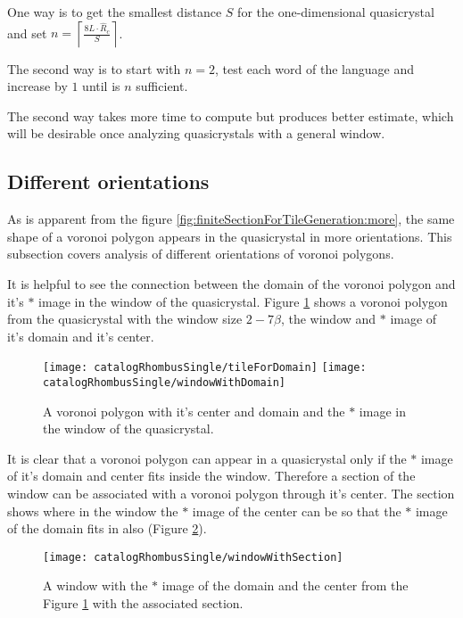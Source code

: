 \documentclass[text.tex]{subfiles}
\begin{document}
One way is to get the smallest distance $S$ for the one-dimensional quasicrystal and set $n = \left\lceil\frac{8L\cdot\hat{R}_c}{S}\right\rceil$. 

The second way is to start with $n=2$, test each word of the language and increase by $1$ until is $n$ sufficient. 

The second way takes more time to compute but produces better estimate, which will be desirable once analyzing quasicrystals with a general window.

\subsection{Different orientations}
As is apparent from the figure \ref{fig:finiteSectionForTileGeneration:more}, the same shape of a voronoi polygon appears in the quasicrystal in more orientations. This subsection covers analysis of different orientations of voronoi polygons. 

It is helpful to see the connection between the domain of the voronoi polygon and it's $\ast$ image in the window of the quasicrystal. Figure \ref{fig:windowWithDomain} shows a voronoi polygon from the quasicrystal with the window size $2-7\beta$, the window and $\ast$ image of it's domain and it's center. 

\begin{figure}[h]
\centering
\texttt{[image: catalogRhombusSingle/tileForDomain]}
\texttt{[image: catalogRhombusSingle/windowWithDomain]}
\caption{A voronoi polygon with it's center and domain and the $\ast$ image in the window of the quasicrystal.}
\label{fig:windowWithDomain}
\end{figure}

It is clear that a voronoi polygon can appear in a quasicrystal only if the $\ast$ image of it's domain and center fits inside the window. Therefore a section of the window can be associated with a voronoi polygon through it's center. The section shows where in the window the $\ast$ image of the center can be so that the $\ast$ image of the domain fits in also (Figure \ref{fig:windowWithSection}). 

\begin{figure}[h]
\centering
\texttt{[image: catalogRhombusSingle/windowWithSection]}
\caption{A window with the $\ast$ image of the domain and the center from the Figure \ref{fig:windowWithDomain} with the associated section.}
\label{fig:windowWithSection}
\end{figure}
\end{document}
